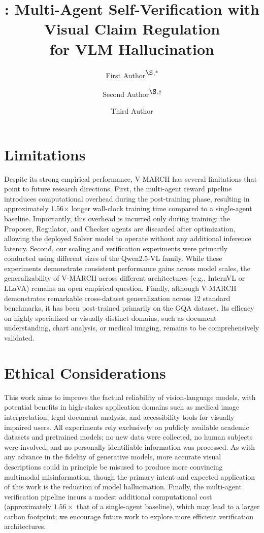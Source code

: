 \documentclass[10pt, a4paper, logo]{googledeepmind}
\title{\ours: Multi-Agent Self-Verification with Visual Claim Regulation \\ for VLM Hallucination}
\author[1]{First Author\textsuperscript{$\S$,*}}
\author[1]{Second Author\textsuperscript{$\S$,$\dag$}}
\author[1]{Third Author}
\affil[1]{Qwen Large Model Application Team, Alibaba}
\affil[2]{xxx University}
\newcommand{\ours}{V-MARCH\xspace}    %
\begin{document}
\maketitle








\clearpage
\section*{Limitations}
Despite its strong empirical performance, \ours has several limitations that point to future research directions.
First, the multi-agent reward pipeline introduces computational overhead during the post-training phase, resulting in approximately 1.56$\times$ longer wall-clock training time compared to a single-agent baseline. Importantly, this overhead is incurred only during training: the Proposer, Regulator, and Checker agents are discarded after optimization, allowing the deployed Solver model to operate without any additional inference latency.
Second, our scaling and verification experiments were primarily conducted using different sizes of the Qwen2.5-VL family. While these experiments demonstrate consistent performance gains across model scales, the generalizability of \ours across different architectures (e.g., InternVL or LLaVA) remains an open empirical question.
Finally, although \ours demonstrates remarkable cross-dataset generalization across 12 standard benchmarks, it has been post-trained primarily on the GQA dataset. Its efficacy on highly specialized or visually distinct domains, such as document understanding, chart analysis, or medical imaging, remains to be comprehensively validated.

\section*{Ethical Considerations}
This work aims to improve the factual reliability of vision-language models, with potential benefits in high-stakes application domains such as medical image interpretation, legal document analysis, and accessibility tools for visually impaired users.
All experiments rely exclusively on publicly available academic datasets and pretrained models; no new data were collected, no human subjects were involved, and no personally identifiable information was processed.
As with any advance in the fidelity of generative models, more accurate visual descriptions could in principle be misused to produce more convincing multimodal misinformation, though the primary intent and expected application of this work is the reduction of model hallucination.
Finally, the multi-agent verification pipeline incurs a modest additional computational cost (approximately $1.56{\times}$ that of a single-agent baseline), which may lead to a larger carbon footprint; we encourage future work to explore more efficient verification architectures.


\nocite{*}



\clearpage
\appendix

\end{document}
